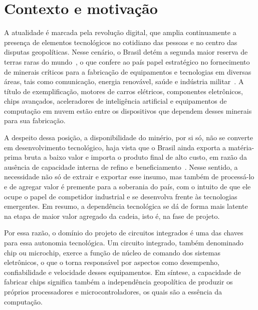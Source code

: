 \section{Contexto e motivação}\label{sec:1.1}

A atualidade é marcada pela revolução digital, que amplia continuamente a presença de elementos tecnológicos no cotidiano das pessoas e no centro das disputas geopolíticas. Nesse cenário, o Brasil detém a segunda maior reserva de terras raras do mundo~\cite{senado2026terras}, o que confere ao país papel estratégico no fornecimento de minerais críticos para a fabricação de equipamentos e tecnologias em diversas áreas, tais como comunicação, energia renovável, saúde e indústria militar~\cite{senado2026terras}. A título de exemplificação, motores de carros elétricos, componentes eletrônicos, chips avançados, aceleradores de inteligência artificial e equipamentos de computação em nuvem estão entre os dispositivos que dependem desses minerais para sua fabricação.

A despeito dessa posição, a disponibilidade do minério, por si só, não se converte em desenvolvimento tecnológico, haja vista que o Brasil ainda exporta a matéria-prima bruta a baixo valor e importa o produto final de alto custo, em razão da ausência de capacidade interna de refino e beneficiamento~\cite{senado2026terras}. Nesse sentido, a necessidade não só de extrair e exportar esse insumo, mas também de processá-lo e de agregar valor é premente para a soberania do país, com o intuito de que ele ocupe o papel de competidor industrial e se desenvolva frente às tecnologias emergentes. Em resumo, a dependência tecnológica se dá de forma mais latente na etapa de maior valor agregado da cadeia, isto é, na fase de projeto.

Por essa razão, o domínio do projeto de circuitos integrados é uma das chaves para essa autonomia tecnológica. Um circuito integrado, também denominado chip ou microchip, exerce a função de núcleo de comando dos sistemas eletrônicos, o que o torna responsável por aspectos como desempenho, confiabilidade e velocidade desses equipamentos. Em síntese, a capacidade de fabricar chips significa também a independência geopolítica de produzir os próprios processadores e microcontroladores, os quais são a essência da computação.

